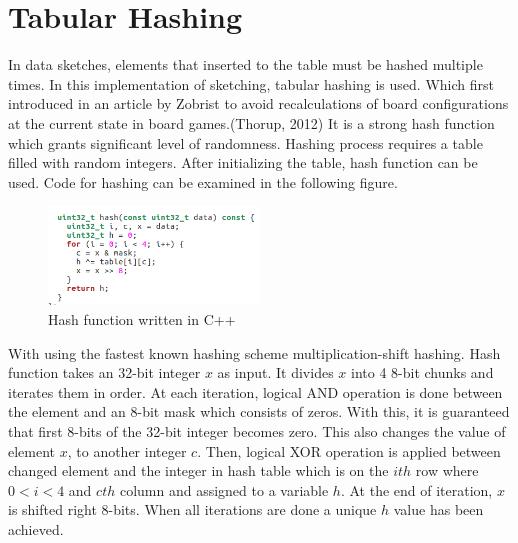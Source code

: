 \documentclass[twoside]{article}
\begin{document}
\section{Tabular Hashing}
In data sketches, elements that inserted to the  table must be hashed multiple times. In this implementation of sketching, tabular hashing is used. Which first introduced in an article by Zobrist to avoid recalculations of board configurations at the current state in board games.(Thorup, 2012) It is a  strong hash function which grants significant level of randomness. Hashing  process requires a table filled with random integers.  After  initializing the table, hash function can be used. Code for hashing can be
examined in the following figure.
\begin{figure}[H]
	\centering
\includegraphics[width=0.5\textwidth]{hashhh.png}
\caption{Hash function written in C++}
\label{fig:hash}
\end{figure}

With using the fastest known hashing scheme multiplication-shift hashing. Hash function takes an 32-bit integer $x$ as input. It divides $x$ into 4 8-bit chunks and iterates them in order. At each iteration, logical AND operation is done between the element and an 8-bit mask which consists of zeros.
With this, it is guaranteed that first 8-bits of the 32-bit integer becomes zero. This also changes the value of element $x$, to another integer $c$. Then, logical XOR operation is applied between changed element and the integer in hash table which is on the $ith$ row where $0<i<4$ and $cth$ column and assigned to a variable $h$. At the end of iteration, $x$ is shifted right 8-bits. When all iterations are done a unique $h$ value has been achieved.
\end{document}
